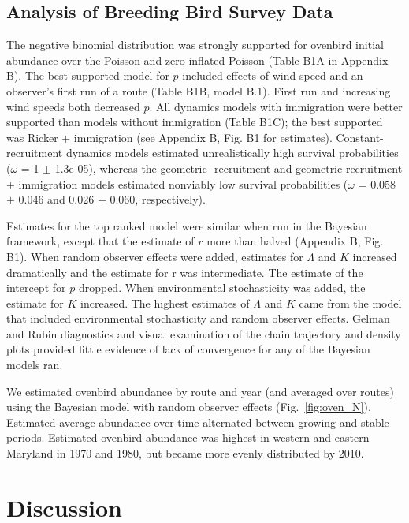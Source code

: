 \documentclass[12pt,english]{article}
\begin{document}
\begin{spacing}{1.9}
\begin{flushleft}
\subsection*{Analysis of Breeding Bird Survey Data}


The negative binomial distribution was strongly supported for ovenbird
initial abundance over the Poisson and zero-inflated Poisson
(Table B1A in Appendix B). 
The best supported model for $p$ included effects of wind speed %
and an observer's first run of a route (Table B1B, model B.1). First run 
and increasing wind speeds both decreased $p$. All dynamics models 
with immigration were better supported than models without immigration 
(Table B1C); the best supported was Ricker + immigration %
(see Appendix B, Fig. B1 for estimates).
Constant-recruitment dynamics models estimated unrealistically high
survival probabilities ($\omega$ = 1 $\pm$ 1.3e-05), whereas 
the geometric- recruitment and geometric-recruitment + immigration
models estimated nonviably low survival probabilities 
($\omega$ =
0.058 $\pm$ 0.046 and 0.026 $\pm$ 0.060, respectively). 

Estimates for the top ranked model 
were similar when
run in the Bayesian framework, except that the estimate of $r$
more than halved (Appendix B, Fig. B1). 
When random observer effects
were added, estimates for $\Lambda$ and $K$ increased dramatically
and the estimate for r was intermediate. The 
estimate of the intercept for $p$ dropped. 
When environmental stochasticity was added, the estimate for $K$ increased. 
The highest estimates of $\Lambda$ and $K$ came 
from the model that included environmental stochasticity and random observer effects. 
Gelman and Rubin diagnostics and visual examination of the chain trajectory and density plots
provided little evidence of lack of convergence for any of the Bayesian models ran.  

We estimated ovenbird abundance by route and year (and averaged over routes) 
using the Bayesian model with random observer effects (Fig.~\ref{fig:oven_N}).  
Estimated average abundance over time alternated between growing and stable periods.  
Estimated ovenbird
abundance was highest in western and eastern Maryland in 1970 and 1980, but became
more evenly distributed by 2010.  

\section*{Discussion}


\end{flushleft}
\end{spacing}
\end{document}
